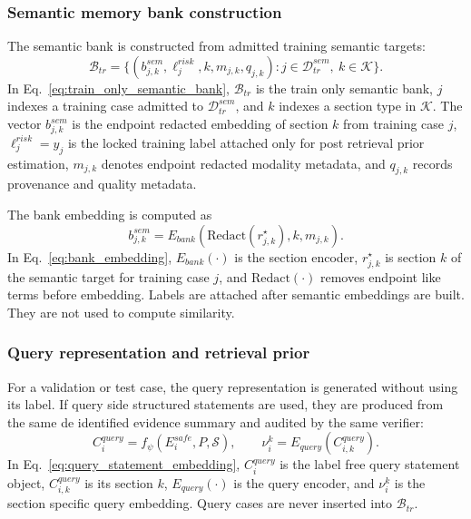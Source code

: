 \subsubsection{Semantic memory bank construction}
\label{subsubsec:semantic_memory_bank_construction}

The semantic bank is constructed from admitted training semantic targets:
\begin{equation}
\mathcal{B}_{tr}
=
\{(b_{j,k}^{sem},\ell_j^{risk},k,m_{j,k},q_{j,k}):j\in\mathcal{D}_{tr}^{sem},\ k\in\mathcal{K}\}.
\label{eq:train_only_semantic_bank}
\end{equation}
In Eq.~\eqref{eq:train_only_semantic_bank}, $\mathcal{B}_{tr}$ is the train only semantic bank, $j$ indexes a training case admitted to $\mathcal{D}_{tr}^{sem}$, and $k$ indexes a section type in $\mathcal{K}$. The vector $b_{j,k}^{sem}$ is the endpoint redacted embedding of section $k$ from training case $j$, $\ell_j^{risk}=y_j$ is the locked training label attached only for post retrieval prior estimation, $m_{j,k}$ denotes endpoint redacted modality metadata, and $q_{j,k}$ records provenance and quality metadata.

The bank embedding is computed as
\begin{equation}
b_{j,k}^{sem}=E_{bank}(\mathrm{Redact}(r_{j,k}^{\star}),k,m_{j,k}).
\label{eq:bank_embedding}
\end{equation}
In Eq.~\eqref{eq:bank_embedding}, $E_{bank}(\cdot)$ is the section encoder, $r_{j,k}^{\star}$ is section $k$ of the semantic target for training case $j$, and $\mathrm{Redact}(\cdot)$ removes endpoint like terms before embedding. Labels are attached after semantic embeddings are built. They are not used to compute similarity.

\subsubsection{Query representation and retrieval prior}
\label{subsubsec:query_retrieval_prior}

For a validation or test case, the query representation is generated without using its label. If query side structured statements are used, they are produced from the same de identified evidence summary and audited by the same verifier:
\begin{equation}
C_i^{query}=f_{\psi}(E_i^{safe},P,\mathcal{S}),
\qquad
\nu_i^k=E_{query}(C_{i,k}^{query}).
\label{eq:query_statement_embedding}
\end{equation}
In Eq.~\eqref{eq:query_statement_embedding}, $C_i^{query}$ is the label free query statement object, $C_{i,k}^{query}$ is its section $k$, $E_{query}(\cdot)$ is the query encoder, and $\nu_i^k$ is the section specific query embedding. Query cases are never inserted into $\mathcal{B}_{tr}$.

